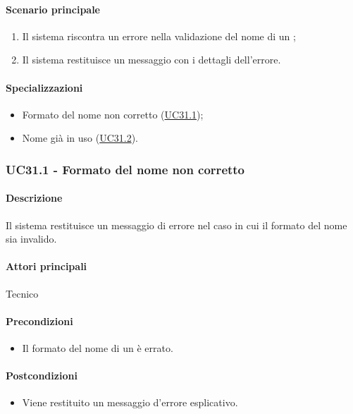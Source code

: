 \paragraph*{Scenario principale}
\begin{enumerate}
  \item Il sistema riscontra un errore nella validazione del nome di un ;
  \item Il sistema restituisce un messaggio con i dettagli dell'errore.  
\end{enumerate}

\paragraph*{Specializzazioni}
\begin{itemize}
  \item Formato del nome non corretto (\hyperref[UC31point1]{UC31.1});
  \item Nome già in uso (\hyperref[UC31point2]{UC31.2}).
\end{itemize}


\subsubsection{UC31.1 - Formato del nome non corretto}\label{UC31point1}
\paragraph*{Descrizione}
Il sistema restituisce un messaggio di errore nel caso in cui il formato del nome sia invalido.

\paragraph*{Attori principali}
Tecnico

\paragraph*{Precondizioni}
\begin{itemize}
  \item Il formato del nome di un  è errato.
\end{itemize}

\paragraph*{Postcondizioni}
\begin{itemize}
  \item Viene restituito un messaggio d'errore esplicativo.
\end{itemize}

